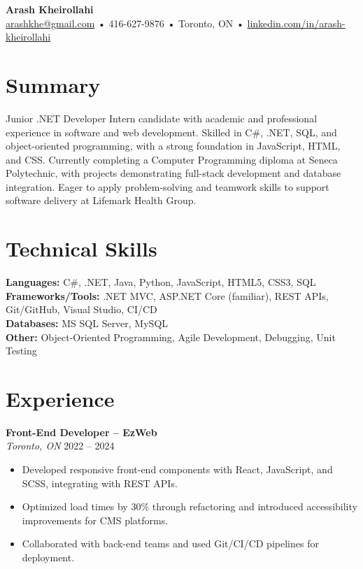 \documentclass[letterpaper,10pt]{article}
\begin{document}

{\LARGE \textbf{Arash Kheirollahi}}\\
\href{mailto:arashkhe@gmail.com}{arashkhe@gmail.com} • 416-627-9876 • Toronto, ON • \href{https://linkedin.com/in/arash-kheirollahi}{linkedin.com/in/arash-kheirollahi}

\vspace{1em}

\section*{Summary}
Junior .NET Developer Intern candidate with academic and professional experience in software and web development. Skilled in C\#, .NET, SQL, and object-oriented programming, with a strong foundation in JavaScript, HTML, and CSS. Currently completing a Computer Programming diploma at Seneca Polytechnic, with projects demonstrating full-stack development and database integration. Eager to apply problem-solving and teamwork skills to support software delivery at Lifemark Health Group.

\section*{Technical Skills}
\textbf{Languages:} C\#, .NET, Java, Python, JavaScript, HTML5, CSS3, SQL \\
\textbf{Frameworks/Tools:} .NET MVC, ASP.NET Core (familiar), REST APIs, Git/GitHub, Visual Studio, CI/CD \\
\textbf{Databases:} MS SQL Server, MySQL \\
\textbf{Other:} Object-Oriented Programming, Agile Development, Debugging, Unit Testing

\section*{Experience}
\textbf{Front-End Developer – EzWeb}\\
\textit{Toronto, ON} \hfill 2022 -- 2024
\begin{itemize}[leftmargin=*]
  \item Developed responsive front-end components with React, JavaScript, and SCSS, integrating with REST APIs.
  \item Optimized load times by 30\% through refactoring and introduced accessibility improvements for CMS platforms.
  \item Collaborated with back-end teams and used Git/CI/CD pipelines for deployment.
\end{itemize}
\end{document}
